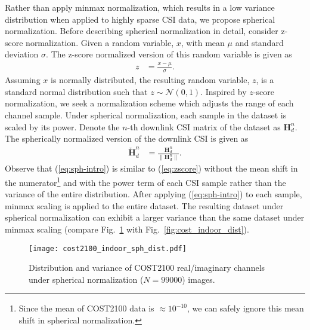 \label{sect:sph_norm_method}
Rather than apply minmax normalization, which results in a low variance distribution when applied to highly sparse CSI data, we propose spherical normalization. Before describing spherical normalization in detail, consider z-score normalization. Given a random variable, $x$, with mean $\mu$ and standard deviation $\sigma$. The z-score normalized version of this random variable is given as
\begin{align}
	z &= \frac{x - \mu}{\sigma}. \label{eq:zscore}
\end{align}
Assuming $x$ is normally distributed, the resulting random variable, $z$, is a standard normal distribution such that $z \sim \mathcal N(0,1)$. Inspired by $z$-score normalization, we seek a normalization scheme which adjusts the range of each channel sample. Under spherical normalization, each sample in the dataset is scaled by its power. Denote the $n$-th downlink CSI matrix of the dataset as $\mathbf H_d^n$. The spherically normalized version of the downlink CSI is given as
\begin{align}
	\mathbf{\check H}_d^n &= \frac{\mathbf H_d^n}{\|\mathbf H_d^n\|}. \label{eq:sph-intro}
\end{align}
Observe that (\ref{eq:sph-intro}) is similar to (\ref{eq:zscore}) without the mean shift in the numerator\footnote{Since the mean of COST2100 data is $\approx 10^{-10}$, we can safely ignore this mean shift in spherical normalization.} and with the power term of each CSI sample rather than the variance of the entire distribution. After applying (\ref{eq:sph-intro}) to each sample, minmax scaling is applied to the entire dataset. The resulting dataset under spherical normalization can exhibit a larger variance than the same dataset under minmax scaling (compare Fig.~\ref{fig:cost_indoor_sph_dist} with Fig.~\ref{fig:cost_indoor_dist}). 
\begin{figure}[htb]
	\centering
	\texttt{[image: cost2100\_indoor\_sph\_dist.pdf]}
	\medskip
	\caption{Distribution and variance of COST2100 real/imaginary channels under spherical normalization ($N=99000$) images.}
	\label{fig:cost_indoor_sph_dist}
\end{figure}

